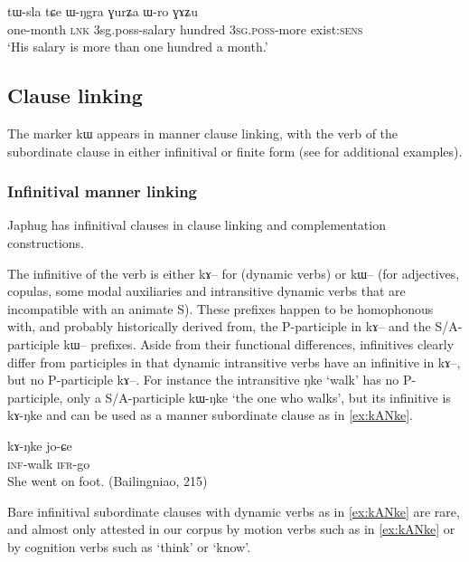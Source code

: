 \documentclass[oldfontcommands,oneside,a4paper,11pt]{article}
\newcommand{\ipa}[1]{{\phon #1}} %
\begin{document}
 \begin{exe} 
\ex \label{ex:tWsla.tCe}
\gll  
  \ipa{tɯ-sla} \ipa{tɕe} \ipa{ɯ-ŋgra} \ipa{ɣurʑa} \ipa{ɯ-ro} \ipa{ɣɤʑu} \\
  one-month \textsc{lnk} 3sg.poss-salary hundred \textsc{3sg.poss}-more exist:\textsc{sens} \\
  \glt `His salary is more than one hundred a month.'
  \end{exe}  
 
  
 \subsection{Clause linking} \label{sec:linking}
 The marker \ipa{kɯ} appears in manner clause linking, with the verb of the subordinate clause in either infinitival or finite form (see \citealt{jacques14linking} for additional examples).
 
 \subsubsection{Infinitival manner linking} \label{sec:manner}
Japhug has infinitival clauses in clause linking and complementation constructions.

The infinitive of the verb is either \ipa{kɤ--} for (dynamic verbs) or \ipa{kɯ--} (for adjectives, copulas, some modal auxiliaries and intransitive dynamic verbs that are incompatible with an animate S). These prefixes happen to be homophonous with, and probably historically derived from, the P-participle in \ipa{kɤ--} and the S/A-participle \ipa{kɯ--} prefixes. Aside from their functional differences, infinitives clearly differ from participles in that dynamic intransitive verbs have an infinitive in \ipa{kɤ--}, but no P-participle \ipa{kɤ--}. For instance the intransitive \ipa{ŋke} `walk' has no P-participle, only a S/A-participle \ipa{kɯ-ŋke} `the one who walks', but its infinitive is \ipa{kɤ-ŋke} and can be used as a manner subordinate clause as in \ref{ex:kANke}.

\begin{exe}
\ex \label{ex:kANke}
\gll
\ipa{kɤ-ŋke} \ipa{jo-ɕe} \\
\textsc{inf}-walk \textsc{ifr}-go \\
\glt She went on foot. (Bailingniao, 215)
\end{exe} 

Bare infinitival subordinate clauses with dynamic verbs as in \ref{ex:kANke} are rare, and almost only attested in our corpus by motion verbs such as in \ref{ex:kANke} or by cognition verbs such as `think' or `know'.
\end{document}
